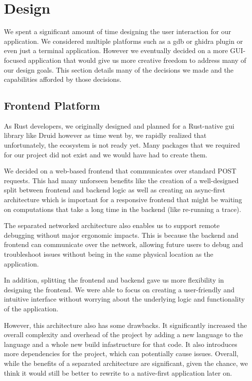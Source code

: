 \chapter{Design}
We spent a significant amount of time designing the user interaction for our application. We considered multiple platforms such as a gdb or ghidra plugin or even just a terminal application. However we eventually decided on a more GUI-focused application that would give us more creative freedom to address many of our design goals. This section details many of the decisions we made and the capabilities afforded by those decisions. 


\section{Frontend Platform}
As Rust developers, we originally designed and planned for a Rust-native gui library like Druid \cite{druid} however as time went by, we rapidly realized that unfortunately, the ecosystem is not ready yet. Many packages that we required for our project did not exist and we would have had to create them.

We decided on a web-based frontend that communicates over standard POST requests. This had many unforseen benefits like the creation of a well-designed split between frontend and backend logic as well as creating an async-first architecture which is important for a responsive frontend that might be waiting on computations that take a long time in the backend (like re-running a trace). 

The separated networked architecture also enables us to support remote debugging without major ergonomic impacts. This is because the backend and frontend can communicate over the network, allowing future users to debug and troubleshoot issues without being in the same physical location as the application.

In addition, splitting the frontend and backend gave us more flexibility in designing the frontend. We were able to focus on creating a user-friendly and intuitive interface without worrying about the underlying logic and functionality of the application.

However, this architecture also has some drawbacks. It significantly increased the overall complexity and overhead of the project by adding a new language to the language and a whole new build infastructure for that code. It also introduces more dependencies for the project, which can potentially cause issues. Overall, while the benefits of a separated architecture are significant, given the chance, we think it would still be better to rewrite to a native-first application later on. 

